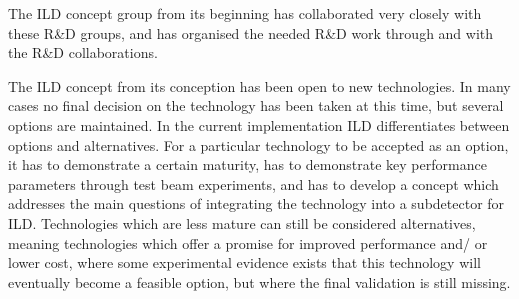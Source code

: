 \documentclass[%
 amsmath,amssymb,
 aps,
]{revtex4-1}
\begin{document}
The ILD concept group from its beginning has collaborated very closely with these R\&D groups, and has organised the needed R\&D work through and with the R\&D collaborations. 

The ILD concept from its conception has been open to new technologies. 
In many cases no final decision on the technology has been taken at this time, but several options are maintained. In the current implementation ILD differentiates between options and alternatives. 
For a particular technology to be accepted as an option, it has to demonstrate a certain maturity, has to demonstrate key performance parameters through test beam experiments, and has to develop a concept which addresses the main questions of integrating the technology into a subdetector for ILD. Technologies which are less mature can still be considered alternatives, meaning technologies which offer a promise for improved performance and/ or lower cost, where some experimental evidence exists that this technology will eventually become a feasible option, but where the final validation is still missing. 
\end{document}
